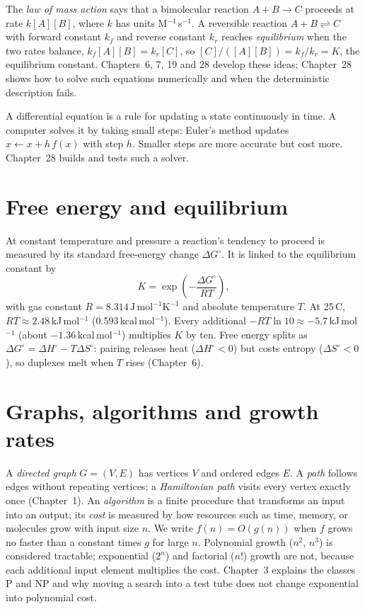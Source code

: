 The \emph{law of mass action} says that a bimolecular reaction
$A+B\to C$ proceeds at rate $k[A][B]$, where $k$ has units
M$^{-1}$\,s$^{-1}$. A reversible reaction $A+B\rightleftharpoons C$ with forward
constant $k_f$ and reverse constant $k_r$ reaches \emph{equilibrium} when
the two rates balance, $k_f[A][B]=k_r[C]$, so
$[C]/([A][B])=k_f/k_r=K$, the equilibrium constant. Chapters~6, 7, 19 and 28
develop these ideas; Chapter~28 shows how to solve such equations numerically
and when the deterministic description fails.

\begin{CSBridge}
A differential equation is a rule for updating a state continuously in time. A
computer solves it by taking small steps: Euler's method updates
$x\leftarrow x+h\,f(x)$ with step $h$. Smaller steps are more accurate but cost
more. Chapter~28 builds and tests such a solver.
\end{CSBridge}

\section{Free energy and equilibrium}
At constant temperature and pressure a reaction's tendency to proceed is
measured by its standard free-energy change $\Delta G^{\circ}$. It is linked to
the equilibrium constant by
\[
K=\exp\!\left(-\frac{\Delta G^{\circ}}{RT}\right),
\]
with gas constant $R=8.314\,\mathrm{J\,mol^{-1}K^{-1}}$ and absolute temperature
$T$. At 25\,\textdegree C, $RT\approx2.48$\,kJ\,mol$^{-1}$ (0.593\,kcal\,mol$^{-1}$).
Every additional $-RT\ln10\approx-5.7$\,kJ\,mol$^{-1}$ (about $-1.36$\,kcal\,mol$^{-1}$)
multiplies $K$ by ten. Free energy splits as
$\Delta G^{\circ}=\Delta H^{\circ}-T\Delta S^{\circ}$: pairing releases heat
($\Delta H^{\circ}<0$) but costs entropy ($\Delta S^{\circ}<0$), so duplexes melt
when $T$ rises (Chapter~6).

\section{Graphs, algorithms and growth rates}
A \emph{directed graph} $G=(V,E)$ has vertices $V$ and ordered edges $E$. A
\emph{path} follows edges without repeating vertices; a \emph{Hamiltonian path}
visits every vertex exactly once (Chapter~1). An \emph{algorithm} is a finite
procedure that transforms an input into an output; its \emph{cost} is measured
by how resources such as time, memory, or molecules grow with input size $n$.
We write $f(n)=O(g(n))$ when $f$ grows no faster than a constant times $g$ for
large $n$. Polynomial growth ($n^2$, $n^3$) is considered tractable;
exponential ($2^n$) and factorial ($n!$) growth are not, because each additional
input element multiplies the cost. Chapter~3 explains the classes P and NP and
why moving a search into a test tube does not change exponential into
polynomial cost.


